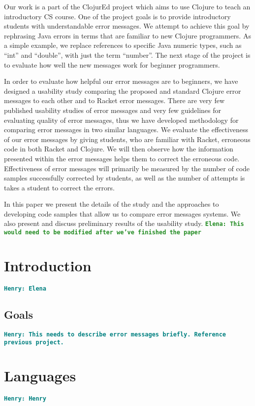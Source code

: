 \documentclass[12pt]{article}
\newcommand{\comment}[1]{{\bf \tt  {#1}}}
\newcommand{\emcomment}[1]{\textcolor{ForestGreen}{\comment{Elena: {#1}}}}
\newcommand{\hfcomment}[1]{\textcolor{Teal}{\comment{Henry: {#1}}}}
\begin{document}
Our work is a part of the ClojurEd project which aims to use Clojure to teach an introductory CS course. One of the project goals is to provide introductory students with understandable error messages. We attempt to achieve this goal by rephrasing Java errors in terms that are familiar to new Clojure programmers. As a simple example, we replace references to specific Java numeric types, such as “int” and “double”, with just the term “number”. The next stage of the project is to evaluate how well the new messages work for beginner programmers. 

In order to evaluate how helpful our error messages are to beginners, we have designed a usability study comparing the proposed and standard Clojure error messages to each other and to Racket error messages. There are very few published usability studies of error messages and very few guidelines for evaluating quality of error messages, thus we have developed methodology for comparing error messages in two similar languages. We evaluate the effectiveness of our error messages by giving students, who are familiar with Racket, erroneous code in both Racket and Clojure. We will then observe how the information presented within the error messages helps them to correct the erroneous code. Effectiveness of error messages will primarily be measured by the number of code samples successfully corrected by students, as well as the number of attempts is takes a student to correct the errors. 

In this paper we present the details of the study and the approaches to developing code samples that allow us to compare error messages systems. We also present and discuss preliminary results of the usability study. 
\emcomment{This would need to be modified after we've finished the paper}
\newpage
\setcounter{page}{1}

\section{Introduction}\label{sec:intro}
	\hfcomment{Elena}
	\subsection{Goals}\label{sec:goals}
	\hfcomment{This needs to describe error messages briefly. Reference previous project.}
\section{Languages}\label{sec:lang}
	\hfcomment{Henry}
\end{document}
